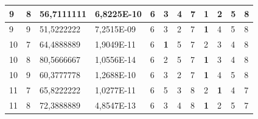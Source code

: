 \documentclass[conference]{IEEEtran}
\begin{document}
\begin{table}[]
\begin{tabular}{|llll|llllllll|}
		\multicolumn{1}{|l|}{9}   & \multicolumn{1}{l|}{8}         & \multicolumn{1}{l|}{56,7111111}    & 6,8225E-10 & \multicolumn{1}{l|}{6}   & \multicolumn{1}{l|}{3}          & \multicolumn{1}{l|}{4}          & \multicolumn{1}{l|}{7}   & \multicolumn{1}{l|}{\textbf{1}} & \multicolumn{1}{l|}{2}          & \multicolumn{1}{l|}{5}          & 8                      \\ \hline
		\multicolumn{1}{|l|}{9}   & \multicolumn{1}{l|}{9}         & \multicolumn{1}{l|}{51,5222222}    & 7,2515E-09 & \multicolumn{1}{l|}{6}   & \multicolumn{1}{l|}{3}          & \multicolumn{1}{l|}{2}          & \multicolumn{1}{l|}{7}   & \multicolumn{1}{l|}{\textbf{1}} & \multicolumn{1}{l|}{4}          & \multicolumn{1}{l|}{5}          & 8                      \\ \hline
		\multicolumn{1}{|l|}{10}  & \multicolumn{1}{l|}{7}         & \multicolumn{1}{l|}{64,4888889}    & 1,9049E-11 & \multicolumn{1}{l|}{6}   & \multicolumn{1}{l|}{\textbf{1}} & \multicolumn{1}{l|}{5}          & \multicolumn{1}{l|}{7}   & \multicolumn{1}{l|}{2}          & \multicolumn{1}{l|}{3}          & \multicolumn{1}{l|}{4}          & 8                      \\ \hline
		\multicolumn{1}{|l|}{10}  & \multicolumn{1}{l|}{8}         & \multicolumn{1}{l|}{80,5666667}    & 1,0556E-14 & \multicolumn{1}{l|}{6}   & \multicolumn{1}{l|}{2}          & \multicolumn{1}{l|}{5}          & \multicolumn{1}{l|}{7}   & \multicolumn{1}{l|}{\textbf{1}} & \multicolumn{1}{l|}{3}          & \multicolumn{1}{l|}{4}          & 8                      \\ \hline
		\multicolumn{1}{|l|}{10}  & \multicolumn{1}{l|}{9}         & \multicolumn{1}{l|}{60,3777778}    & 1,2688E-10 & \multicolumn{1}{l|}{6}   & \multicolumn{1}{l|}{3}          & \multicolumn{1}{l|}{2}          & \multicolumn{1}{l|}{7}   & \multicolumn{1}{l|}{\textbf{1}} & \multicolumn{1}{l|}{4}          & \multicolumn{1}{l|}{5}          & 8                      \\ \hline
		\multicolumn{1}{|l|}{11}  & \multicolumn{1}{l|}{7}         & \multicolumn{1}{l|}{65,8222222}    & 1,0277E-11 & \multicolumn{1}{l|}{6}   & \multicolumn{1}{l|}{5}          & \multicolumn{1}{l|}{3}          & \multicolumn{1}{l|}{8}   & \multicolumn{1}{l|}{2}          & \multicolumn{1}{l|}{\textbf{1}} & \multicolumn{1}{l|}{4}          & 7                      \\ \hline
		\multicolumn{1}{|l|}{11}  & \multicolumn{1}{l|}{8}         & \multicolumn{1}{l|}{72,3888889}    & 4,8547E-13 & \multicolumn{1}{l|}{6}   & \multicolumn{1}{l|}{3}          & \multicolumn{1}{l|}{4}          & \multicolumn{1}{l|}{8}   & \multicolumn{1}{l|}{\textbf{1}} & \multicolumn{1}{l|}{2}          & \multicolumn{1}{l|}{5}          & 7                      \\ \hline

\end{tabular}
\end{table}
\end{document}
